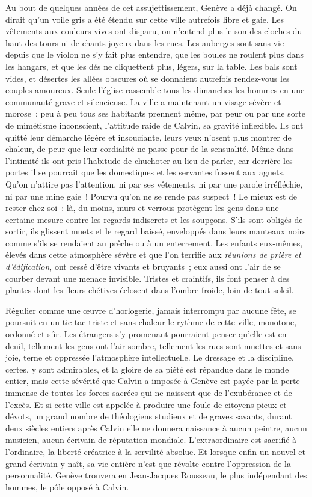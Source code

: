 \documentclass[french,twoside]{book} %
\newcommand\chapterclose{} %
\begin{document}
\noindent Au bout de quelques années de cet assujettissement, Genève a déjà changé. On dirait qu’un voile gris a été étendu sur cette ville autrefois libre et gaie. Les vêtements aux couleurs vives ont disparu, on n’entend plus le son des cloches du haut des tours ni de chants joyeux dans les rues. Les auberges sont sans vie depuis que le violon ne s’y fait plus entendre, que les boules ne roulent plus dans les hangars, et que les dés ne cliquettent plus, légers, sur la table. Les bals sont vides, et désertes les allées obscures où se donnaient autrefois rendez-vous les couples amoureux. Seule l’église rassemble tous les dimanches les hommes en une communauté grave et silencieuse. La ville a maintenant un visage sévère et morose ; peu à peu tous ses habitants prennent même, par peur ou par une sorte de mimétisme inconscient, l’attitude raide de Calvin, sa gravité inflexible. Ils ont quitté leur démarche légère et insouciante, leurs yeux n’osent plus montrer de chaleur, de peur que leur cordialité ne passe pour de la sensualité. Même dans l’intimité ils ont pris l’habitude de chuchoter au lieu de parler, car derrière les portes il se pourrait que les domestiques et les servantes fussent aux aguets. Qu’on n’attire pas l’attention, ni par ses vêtements, ni par une parole irréfléchie, ni par une mine gaie ! Pourvu qu’on ne se rende pas suspect ! Le mieux est de rester chez soi : là, du moins, murs et verrous protègent les gens dans une certaine mesure contre les regards indiscrets et les soupçons. S’ils sont obligés de sortir, ils glissent muets et le regard baissé, enveloppés dans leurs manteaux noirs comme s’ils se rendaient au prêche ou à un enterrement. Les enfants eux-mêmes, élevés dans cette atmosphère sévère et que l’on terrifie aux \emph{réunions de prière et d’édification}, ont cessé d’être vivants et bruyants ; eux aussi ont l’air de se courber devant une menace invisible. Tristes et craintifs, ils font penser à des plantes dont les fleurs chétives éclosent dans l’ombre froide, loin de tout soleil.\par
Régulier comme une œuvre d’horlogerie, jamais interrompu par aucune fête, se poursuit en un tic-tac triste et sans chaleur le rythme de cette ville, monotone, ordonné et sûr. Les étrangers s’y promenant pourraient penser qu’elle est en deuil, tellement les gens ont l’air sombre, tellement les rues sont muettes et sans joie, terne et oppressée l’atmosphère intellectuelle. Le dressage et la discipline, certes, y sont admirables, et la gloire de sa piété est répandue dans le monde entier, mais cette sévérité que Calvin a imposée à Genève est payée par la perte immense de toutes les forces sacrées qui ne naissent que de l’exubérance et de l’excès. Et si cette ville est appelée à produire une foule de citoyens pieux et dévots, un grand nombre de théologiens studieux et de graves savants, durant deux siècles entiers après Calvin elle ne donnera naissance à aucun peintre, aucun musicien, aucun écrivain de réputation mondiale. L’extraordinaire est sacrifié à l’ordinaire, la liberté créatrice à la servilité absolue. Et lorsque enfin un nouvel et grand écrivain y naît, sa vie entière n’est que révolte contre l’oppression de la personnalité. Genève trouvera en Jean-Jacques Rousseau, le plus indépendant des hommes, le pôle opposé à Calvin.
\chapterclose
\end{document}
